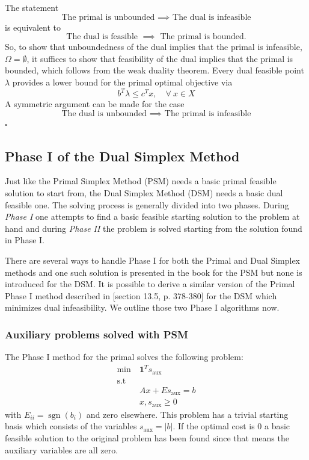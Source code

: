 \begin{enumerate}
          The statement
          $$
              \text{The primal is unbounded } \implies \text{ The dual is infeasible}
          $$
          is equivalent to
          $$
              \text{The dual is feasible } \implies \text{ The primal is bounded}.
          $$
          So, to show that unboundedness of the dual implies that the primal is infeasible, $\Omega = \emptyset$, it suffices to show that feasibility of the dual implies that the primal is bounded, which follows from the weak duality theorem.
          Every dual feasible point $\lambda$ provides a lower bound for the primal optimal objective via
          $$
              b^T\lambda \leq c^T x, \quad \forall \> x\in X
          $$
          A symmetric argument can be made for the case
          $$
              \text{The dual is unbounded } \implies \text{ The primal is infeasible}
          $$
          \hfill$\square$

\end{enumerate}

\subsection{Phase I of the Dual Simplex Method}
Just like the Primal Simplex Method (PSM) needs a basic primal feasible solution to start from, the Dual Simplex Method (DSM) needs a basic dual feasible one.
The solving process is generally divided into two phases.
During \textit{Phase I} one attempts to find a basic feasible starting solution to the problem at hand and during \textit{Phase II} the problem is solved starting from the solution found in Phase I.

There are several ways to handle Phase I for both the Primal and Dual Simplex methods and one such solution is presented in the book for the PSM but none is introduced for the DSM.
It is possible to derive a similar version of the Primal Phase I method described in \cite{NumericalOptimization}[section 13.5, p. 378-380] for the DSM which minimizes dual infeasibility.
We outline those two Phase I algorithms now.

\subsubsection{Auxiliary problems solved with PSM}
The Phase I method for the primal solves the following problem:
\begin{align*}
    \operatorname{min} \> & \mathbf{1}^T s_\text{aux} \\
    \text{s.t}            &                           \\
                          & Ax + Es_\text{aux} = b    \\
                          & x, s_\text{aux} \geq 0
\end{align*}
with $E_{ii} = \operatorname{sgn}(b_i)$ and zero elsewhere.
This problem has a trivial starting basis which consists of the variables $s_\text{aux} = |b|$.
If the optimal cost is 0 a basic feasible solution to the original problem has been found since that means the auxiliary variables are all zero.


